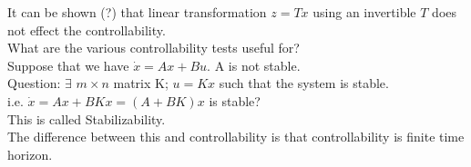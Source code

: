 \documentclass{article}
\begin{document}
It can be shown (?) that linear transformation $z=Tx$ using an invertible $T$ does not effect the controllability.\\

What are the various controllability tests useful for?\\
Suppose that we have $\dot{x}=Ax+Bu$. A is not stable.\\
Question: $\exists$ $m\times n$ matrix K; $u=Kx$ such that the system is stable.\\
i.e. $\dot{x}=Ax+BKx=(A+BK)x$ is stable?\\

This is called Stabilizability.\\
The difference between this and controllability is that controllability is finite time horizon.\\
\end{document}
